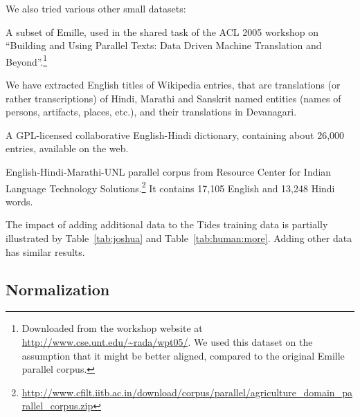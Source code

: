 \documentclass[11pt]{article}
\newcommand{\hindi}[1]{{\hi #1}}
\def\Tref#1{Table~\ref{#1}}
\begin{document}
\label{sec:data-o}

We also tried various other small datasets:

 A subset of Emille, used in the shared task of the
 ACL 2005 workshop on ``Building and Using Parallel Texts: Data Driven Machine
 Translation and Beyond''.\footnote{Downloaded from the workshop website at
 \url{http://www.cse.unt.edu/~rada/wpt05/}. We used this dataset on the
 assumption that it might be better aligned, compared to the original Emille
 parallel corpus.}

 We have extracted English titles of Wikipedia
 entries, that are translations (or rather transcriptions) of Hindi, Marathi and
 Sanskrit named entities (names of persons, artifacts, places, etc.), and their
 translations in Devanagari.
 
 
 
 A GPL-licensed collaborative English-Hindi dictionary, containing about 26,000
 entries, available on the web.

 English-Hindi-Marathi-UNL parallel corpus from Resource Center for Indian
 Language Technology
 Solutions.\footnote{\url{http://www.cfilt.iitb.ac.in/download/corpus/parallel/agriculture_domain_parallel_corpus.zip}}
 It contains 17,105 English and 13,248 Hindi words.
 
The impact of adding additional data to the Tides training data is partially
illustrated by \Tref{tab:joshua} and \Tref{tab:human:more}. Adding other data
has similar results.

\subsection{Normalization}
\end{document}
